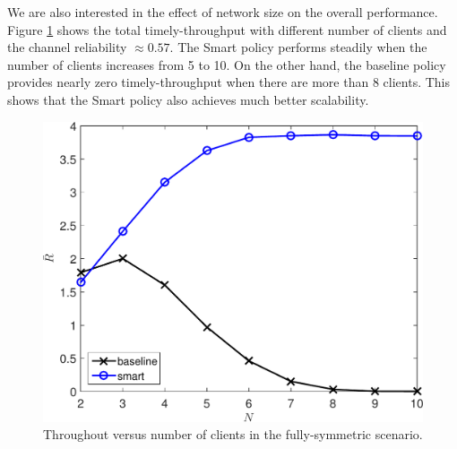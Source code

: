 \documentclass{article}
\begin{document}
We are also interested in the effect of network size on the overall performance. Figure \ref{sim: sym: different N} shows the total timely-throughput with different number of clients and the channel reliability $\approx 0.57$. The Smart policy performs steadily when the number of clients increases from 5 to 10. On the other hand, the baseline policy provides nearly zero timely-throughput when there are more than 8 clients. This shows that the Smart policy also achieves much better scalability.

\begin{figure}[htbp]
\centering
\includegraphics[scale=0.5]{R_N_sym.pdf}
\caption{Throughout versus number of clients in the fully-symmetric scenario.}
\label{sim: sym: different N}
\end{figure}


\end{document}
